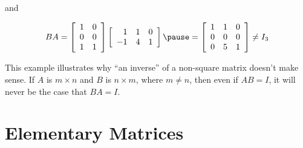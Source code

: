 \documentclass[pdf
,handout
]{beamer}
\begin{document}
{{{{\begin{example}
and
\vspace*{-.2in}

\[ BA= 
\left[\begin{array}{rr}
1 & 0 \\ 0 & 0 \\ 1 & 1 \end{array}\right]
\left[\begin{array}{rrr}
1 & 1 & 0 \\ -1 & 4 & 1 \end{array}\right]
\pause
= \left[ \begin{array}{rrr}
1 & 1 & 0 \\
0 & 0 & 0 \\
0 & 5 & 1
\end{array} \right] \neq I_3 \]
\end{example}
\pause
\begin{alertblock}{}
This example illustrates why ``an inverse'' of a non-square matrix
doesn't make sense.
If $A$ is $m\times n$ and $B$ is $n\times m$, where $m\neq n$,
then even if $AB=I$, it will never be the case that $BA=I$.
\end{alertblock}
}}


\section{Elementary Matrices}
}}
\end{document}
